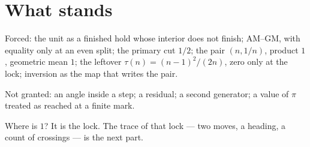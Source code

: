 \documentclass[10pt,a4paper]{article}
\theoremstyle{plain}
\theoremstyle{definition}
\theoremstyle{remark}
\begin{document}
\section{What stands}

Forced:
the unit as a finished hold whose interior does not finish;
AM--GM, with equality only at an even split;
the primary cut \(1/2\);
the pair \((n,1/n)\), product \(1\), geometric mean \(1\);
the leftover \(\tau(n)=(n-1)^2/(2n)\), zero only at the lock;
inversion as the map that writes the pair.

Not granted:
an angle inside a step;
a residual;
a second generator;
a value of \(\pi\) treated as reached at a finite mark.

Where is \(1\)?
It is the lock.
The trace of that lock --- two moves, a heading, a count of crossings --- is the next part.
\end{document}
